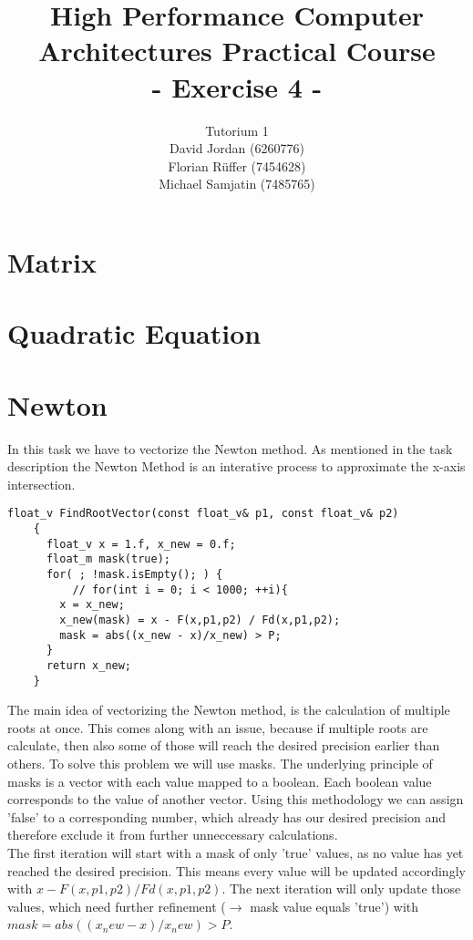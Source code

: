 \documentclass{article}
\title{\textbf{High Performance Computer Architectures Practical Course \\ - Exercise 4 -} \\[10mm]}
\author{Tutorium 1 \\[10mm] David Jordan (6260776) \\[1mm] Florian Rüffer (7454628) \\[1mm] Michael Samjatin (7485765) \\[10mm]}
\begin{document}
\maketitle
\newpage
\section{Matrix}
\section{Quadratic Equation}
\section{Newton}
In this task we have to vectorize the Newton method. As mentioned in the task description
the Newton Method is an interative process to approximate the x-axis intersection. \\[5mm]

\begin{lstlisting}[caption=Newton.cpp]
    float_v FindRootVector(const float_v& p1, const float_v& p2)
    {
      float_v x = 1.f, x_new = 0.f;
      float_m mask(true);
      for( ; !mask.isEmpty(); ) {
          // for(int i = 0; i < 1000; ++i){ 
        x = x_new;
        x_new(mask) = x - F(x,p1,p2) / Fd(x,p1,p2);
        mask = abs((x_new - x)/x_new) > P;
      }
      return x_new;
    }
\end{lstlisting}

\noindent The main idea of vectorizing the Newton method, is the calculation of multiple roots at once.
This comes along with an issue, because if multiple roots are calculate, then also some of those will
reach the desired precision earlier than others. To solve this problem we will use masks.
The underlying principle of masks is a vector with each value mapped to a boolean.
Each boolean value corresponds to the value of another vector.
Using this methodology we can assign 'false' to a corresponding number, which already has our desired precision and therefore
exclude it from further unneccessary calculations.\\

\noindent The first iteration will start with a mask of only 'true' values, as no value has yet reached the desired precision.
This means every value will be updated accordingly with $x - F (x , p1 , p2 ) / Fd (x , p1 , p2 ) $.
The next iteration will only update those values, which need further refinement ($\rightarrow$ mask value equals 'true') with $mask = abs (( x_new - x ) / x_new ) > P $.
\end{document}
